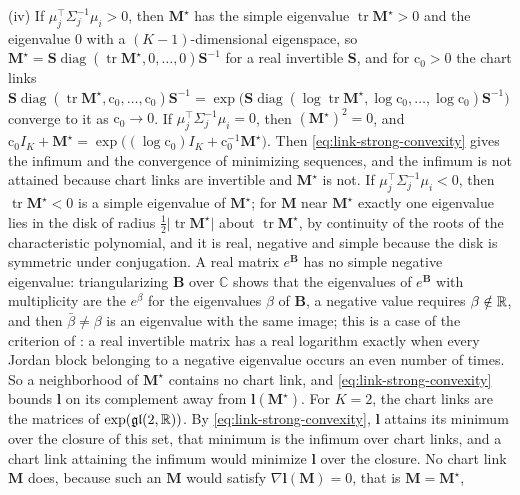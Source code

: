 (iv) If $\mu_j^\top\Sigma_j^{-1}\mu_i>0$, then $\mathbf M^\star$ has the simple eigenvalue
$\operatorname{tr}\mathbf M^\star>0$ and the eigenvalue $0$ with a $(K-1)$-dimensional eigenspace, so
$\mathbf M^\star=\mathbf S\operatorname{diag}(\operatorname{tr}\mathbf M^\star,0,\ldots,0)\mathbf S^{-1}$ for a real invertible
$\mathbf S$, and for $\mathrm c_0>0$ the chart links
$\mathbf S\operatorname{diag}(\operatorname{tr}\mathbf M^\star,\mathrm c_0,\ldots,\mathrm c_0)\mathbf S^{-1}
=\exp\bigl(\mathbf S\operatorname{diag}(\log\operatorname{tr}\mathbf M^\star,\log\mathrm c_0,\ldots,\log\mathrm c_0)\mathbf S^{-1}\bigr)$
converge to it as $\mathrm c_0\to0$. If $\mu_j^\top\Sigma_j^{-1}\mu_i=0$, then $(\mathbf M^\star)^2=0$, and
$\mathrm c_0I_K+\mathbf M^\star=\exp\bigl((\log\mathrm c_0)I_K+\mathrm c_0^{-1}\mathbf M^\star\bigr)$. Then
\eqref{eq:link-strong-convexity} gives the infimum and the convergence of minimizing sequences, and the
infimum is not attained because chart links are invertible and $\mathbf M^\star$ is not. If
$\mu_j^\top\Sigma_j^{-1}\mu_i<0$, then $\operatorname{tr}\mathbf M^\star<0$ is a simple eigenvalue of $\mathbf M^\star$; for
$\mathbf M$ near $\mathbf M^\star$ exactly one eigenvalue lies in the disk of radius
$\frac12\lvert\operatorname{tr}\mathbf M^\star\rvert$ about $\operatorname{tr}\mathbf M^\star$, by continuity of the roots of
the characteristic polynomial, and it is real, negative and simple because the disk is symmetric under
conjugation. A real matrix $e^{\mathbf B}$ has no simple negative eigenvalue: triangularizing $\mathbf B$ over
$\mathbb C$ shows that the eigenvalues of $e^{\mathbf B}$ with multiplicity are the $e^\beta$ for the eigenvalues
$\beta$ of $\mathbf B$, a negative value requires $\beta\notin\mathbb R$, and then $\bar\beta\neq\beta$ is an eigenvalue with
the same image; this is a case of the criterion of \citet[Theorem~1]{culver1966existence}: a real
invertible matrix has a real logarithm exactly when every Jordan block belonging to a negative eigenvalue
occurs an even number of times. So a neighborhood of $\mathbf M^\star$ contains no chart link, and
\eqref{eq:link-strong-convexity} bounds $\mathbf l$ on its complement away from $\mathbf l(\mathbf M^\star)$. For
$K=2$, the chart links are the matrices of $\exp(\mathfrak{gl}(2,\mathbb R))$. By \eqref{eq:link-strong-convexity},
$\mathbf l$ attains its minimum over the closure of this set, that minimum is the infimum over chart links,
and a chart link attaining the infimum would minimize $\mathbf l$ over the closure. No chart link $\mathbf M$
does, because such an $\mathbf M$ would satisfy $\nabla\mathbf l(\mathbf M)=0$, that is $\mathbf M=\mathbf M^\star$,
